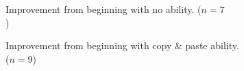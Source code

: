 \documentclass[10pt, twocolumn]{article}
\begin{document}
\begin{figure}[t]
\centering
	\begin{subfigure}[c]{2.1in}
		\centering
    	\caption{
    	Improvement from beginning with no ability. ($n=7$)~~~~~~~~~~~~~~~~~~~~~~~~~~
    	}
    	\label{shellDetailSkill1}
    \end{subfigure}
    \begin{subfigure}[c]{2.1in}
        \centering
    	\caption{
    	Improvement from beginning with copy \& paste ability. ($n=9$)~~~~~~~~~~~~~~~~~~~~~~~~
    	}
    	\label{shellDetailSkill2}
    \end{subfigure}
    \begin{subfigure}[c]{2.1in}
    	\centering

\end{subfigure}
\end{figure}
\end{document}
